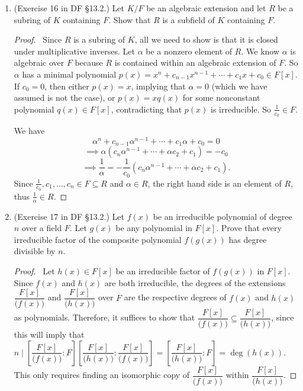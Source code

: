 \documentclass[10pt]{article}
\begin{document}
\begin{enumerate}[leftmargin=0cm,itemindent=.5cm,labelwidth=\itemindent,labelsep=0cm,align=left]
\begin{proof}
\end{proof}

\item (Exercise 16 in DF \S 13.2.) Let $K/F$ be an algebraic extension and let $R$ be a subring of $K$ containing $F$.  Show that $R$ is a subfield of $K$ containing $F$.

\begin{proof}

\ Since $R$ is a subring of $K$, all we need to show is that it is closed under multiplicative inverses.  Let $\alpha$ be a nonzero element of $R$.  We know $\alpha$ is algebraic over $F$ because $R$ is contained within an algebraic extension of $F$.  So $\alpha$ has a minimal polynomial $p(x) = x^n + c_{n-1}x^{n-1} + \cdots + c_1 x + c_0 \in F[x]$.  If $c_0 = 0$, then either $p(x) = x$, implying that $\alpha = 0$ (which we have assumed is not the case), or $p(x) = xq(x)$ for some nonconstant polynomial $q(x) \in F[x]$, contradicting that $p(x)$ is irreducible.  So $\frac{1}{c_0} \in F$.

We have $$\alpha^n + c_{n-1} \alpha^{n-1} + \cdots + c_1 \alpha + c_0 = 0$$
$$\implies \alpha (c_n \alpha^{n-1} + \cdots + \alpha c_2 + c_1) = -c_0$$
$$\implies \frac{1}{\alpha} = - \frac{1}{c_0}(c_n \alpha^{n-1} + \cdots + \alpha c_2 + c_1).$$
Since $\frac{1}{c_0}, c_1, \dots, c_n \in F \subseteq R$ and $\alpha \in R$, the right hand side is an element of $R$, thus $\frac{1}{\alpha} \in R$.



\end{proof}

\item (Exercise 17 in DF \S 13.2.) Let $f(x)$ be an irreducible polynomial of degree $n$ over a field $F$.  Let $g(x)$ be any polynomial in $F[x]$.  Prove that every irreducible factor of the composite polynomial $f(g(x))$ has degree divisible by $n$.

\begin{proof}

\ Let $h(x) \in F[x]$ be an irreducible factor of $f(g(x))$ in $F[x]$.  Since $f(x)$ and $h(x)$ are both irreducible, the degrees of the extensions $\dfrac{F[x]}{\big(f(x) \big)}$ and $\dfrac{F[x]}{\big(h(x) \big)}$ over $F$ are the respective degrees of $f(x)$ and $h(x)$ as polynomials.  Therefore, it suffices to show that $\dfrac{F[x]}{\big(f(x) \big)} \subseteq \dfrac{F[x]}{\big(h(x) \big)}$, since this will imply that $n \mid \left[ \dfrac{F[x]}{\big(f(x) \big)} : F \right] \left[ \dfrac{F[x]}{\big(h(x) \big)}:\dfrac{F[x]}{\big(f(x) \big)} \right] = \left[ \dfrac{F[x]}{\big(h(x) \big)} : F \right] = \deg(h(x))$.  This only requires finding an isomorphic copy of $\dfrac{F[x]}{\big(f(x) \big)}$ within $\dfrac{F[x]}{\big(h(x) \big)}$.


\end{proof}
\end{enumerate}
\end{document}
